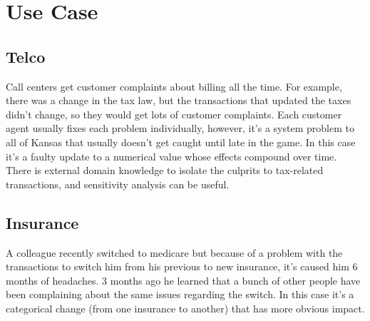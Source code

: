 \section{Use Case}
\label{s:usecase}


\subsection{Telco}

Call centers get customer complaints about billing all the time.
For example, there was a change in the tax law, but the transactions
that updated the taxes didn't change, so they would get lots of
customer complaints.  Each customer agent usually fixes each problem
individually, however, it's a system problem to all of Kansas that
usually doesn't get caught until late in the game.  In this case
it's a faulty update to a numerical value whose effects compound
over time.  There is external domain knowledge to isolate the
culprits to tax-related transactions, and sensitivity analysis can
be useful.

\subsection{Insurance}

A colleague recently switched to medicare but because of a problem
with the transactions to switch him from his previous to new
insurance, it's caused him 6 months of headaches.  3 months ago he
learned that a bunch of other people have been complaining about
the same issues regarding the switch.  In this case it's a categorical
change (from one insurance to another) that has more obvious impact.


